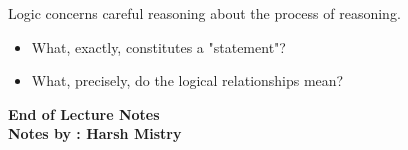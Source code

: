 \documentclass{article}
\newenvironment{exblock}[1]{%
    \tcolorbox[beamer,%
    noparskip,breakable,
    colback=lightgreen,colframe=darkgreen,%
    colbacklower=limegreen!75!lightgreen,%
    title=#1]}%
    {\endtcolorbox}
\begin{document}
Logic concerns careful reasoning about the process of reasoning.

\begin{exblock}{So we need to know}
\begin{itemize}
\item What, exactly, constitutes a "statement"?
\item What, precisely, do the logical relationships mean?
\end{itemize}
\end{exblock}

\begin{center}
\textbf{End of Lecture Notes}\\
\textbf{Notes by : Harsh Mistry}
\end{center}
\end{document}

